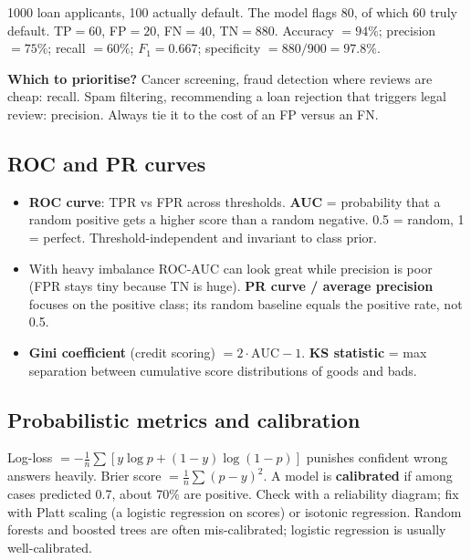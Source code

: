 \begin{example}
1000 loan applicants, 100 actually default. The model flags 80, of which 60 truly default. TP$=60$, FP$=20$, FN$=40$, TN$=880$. Accuracy $=94\%$; precision $=75\%$; recall $=60\%$; $F_1=0.667$; specificity $=880/900=97.8\%$.
\end{example}

\textbf{Which to prioritise?} Cancer screening, fraud detection where reviews are cheap: recall. Spam filtering, recommending a loan rejection that triggers legal review: precision. Always tie it to the cost of an FP versus an FN.

\subsection{ROC and PR curves}
\begin{itemize}
  \item \textbf{ROC curve}: TPR vs FPR across thresholds. \textbf{AUC} = probability that a random positive gets a higher score than a random negative. 0.5 = random, 1 = perfect. Threshold-independent and invariant to class prior.
  \item With heavy imbalance ROC-AUC can look great while precision is poor (FPR stays tiny because TN is huge). \textbf{PR curve / average precision} focuses on the positive class; its random baseline equals the positive rate, not 0.5.
  \item \textbf{Gini coefficient} (credit scoring) $=2\cdot\text{AUC}-1$. \textbf{KS statistic} = max separation between cumulative score distributions of goods and bads.
\end{itemize}

\subsection{Probabilistic metrics and calibration}
Log-loss $=-\frac1n\sum[y\log p+(1-y)\log(1-p)]$ punishes confident wrong answers heavily. Brier score $=\frac1n\sum(p-y)^2$. A model is \textbf{calibrated} if among cases predicted 0.7, about 70\% are positive. Check with a reliability diagram; fix with Platt scaling (a logistic regression on scores) or isotonic regression. Random forests and boosted trees are often mis-calibrated; logistic regression is usually well-calibrated.

